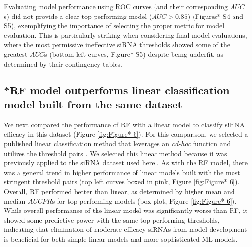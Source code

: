 \documentclass{report}
\begin{document}
 Evaluating model performance using ROC curves (and their corresponding $AUC$s) did not provide a clear top performing model ($AUC > 0.85$) (Figures* S4 and S5), \cite{davis_relationship_2006} exemplifying the importance of selecting the proper metric for model evaluation. This is particularly striking when considering final model evaluations, where the most permissive ineffective siRNA thresholds showed some of the greatest $AUC$s (bottom left curves, Figure* S5) despite being underfit, as determined by their contingency tables.

\subsection{*RF model outperforms linear classification model built from the same dataset}\label{sec:linear vs RF*}
We next compared the performance of RF with a linear model to classify siRNA efficacy in this dataset (Figure \ref{fig:Figure* 6}). For this comparison, we selected a published linear classification method that leverages an \textit{ad-hoc }function and utilizes the threshold pairs \cite{shmushkovich_functional_2018}. We selected this linear method because it was previously applied to the siRNA dataset used here \cite{shmushkovich_functional_2018}. As with the RF model, there was a general trend in higher performance of linear models built with the most stringent threshold pairs (top left curves boxed in pink, Figure \ref{fig:Figure* 6}). Overall, RF performed better than linear, as determined by higher mean and median $AUCPR$s for top performing models (box plot, Figure \ref{fig:Figure* 6}). While overall performance of the linear model was significantly worse than RF, it showed some predictive power with the same top performing thresholds, indicating that elimination of moderate efficacy siRNAs from model development is beneficial for both simple linear models and more sophisticated ML models.
\end{document}
